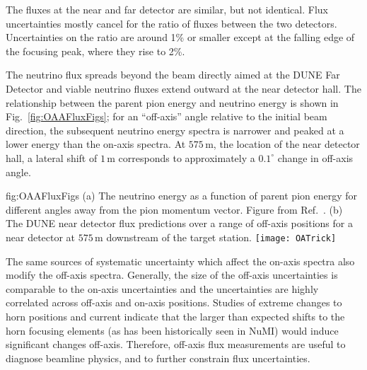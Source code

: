 The fluxes at the near and far detector are similar, but not identical.  Flux uncertainties mostly cancel for the ratio of fluxes between the two detectors.  Uncertainties on the ratio are around 1\% or smaller except at the falling edge of the focusing peak, where they rise to 2\%.    

The neutrino flux spreads beyond the beam directly aimed at the DUNE Far Detector and viable neutrino fluxes extend outward at the near detector hall. The relationship between the parent pion energy and neutrino energy is shown in Fig.~\ref{fig:OAAFluxFigs}; for an ``off-axis'' angle relative to the initial beam direction, the subsequent neutrino energy spectra is narrower and peaked at a lower energy than the on-axis spectra. At $575\,\textrm{m}$, the location of the near detector hall, a lateral shift of $1\,\textrm{m}$ corresponds to approximately a $0.1^\circ$ change in off-axis angle.

\begin{dunefigure}{fig:OAAFluxFigs}
{(a) The neutrino energy as a function of parent pion energy for different angles away from the pion momentum vector. Figure from Ref.~\cite{Duffy:2016owt}. (b) The DUNE near detector flux predictions over a range of off-axis positions for a near detector at $575\,\textrm{m}$ downstream of the target station. }
    \texttt{[image: OATrick]}
\end{dunefigure}

The same sources of systematic uncertainty which affect the on-axis spectra also modify the off-axis spectra.  Generally, the size of the off-axis uncertainties is comparable to the on-axis uncertainties and the uncertainties are highly correlated across off-axis and on-axis positions. Studies of extreme changes to horn positions and current indicate that the larger than expected shifts to the horn focusing elements (as has been historically seen in NuMI) would induce significant changes off-axis. Therefore, off-axis flux measurements are useful to diagnose beamline physics, and to further constrain flux uncertainties.
